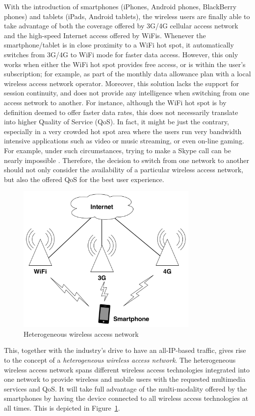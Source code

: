With the introduction of smartphones (iPhones, Android phones, BlackBerry phones) and tablets (iPads, Android tablets), the wireless users are finally able to take advantage of both the coverage offered by 3G/4G cellular access network and the high-speed Internet access offered by WiFis. Whenever the smartphone/tablet is in close proximity to a WiFi hot spot, it automatically switches from 3G/4G to WiFi mode for faster data access. However, this only works when either the WiFi hot spot provides free access, or is within the user's subscription; for example, as part of the monthly data allowance plan with a local wireless access network operator. Moreover, this solution lacks the support for session continuity, and does not provide any intelligence when switching from one access network to another. For instance, although the WiFi hot spot is by definition deemed to offer faster data rates, this does not necessarily translate into higher Quality of Service (QoS). In fact, it might be just the contrary, especially in a very crowded hot spot area where the users run very bandwidth intensive applications such as video or music streaming, or even on-line gaming. For example, under such circumstances, trying to make a Skype call can be nearly impossible \cite{Wisely4gWLAN09}. Therefore, the decision to switch from one network to another should not only consider the availability of a particular wireless access network, but also the offered QoS for the best user experience.

\begin{figure}[t]
    \centering
    \includegraphics[width=3.5in]{Intelligent/Figures/heterogeneous}
    \caption{Heterogeneous wireless access network}
    \label{fig:heterogeneous_intelligent}
\end{figure}

This, together with the industry's drive to have an all-IP-based traffic, gives rise to the concept of a \emph{heterogeneous wireless access network}. The heterogeneous wireless access network spans different wireless access technologies integrated into one network to provide wireless and mobile users with the requested multimedia services and QoS. It will take full advantage of the multi-modality offered by the smartphones by having the device connected to all wireless access technologies at all times. This is depicted in Figure~\ref{fig:heterogeneous_intelligent}.

